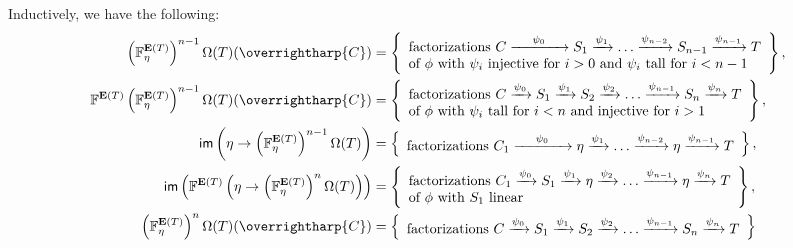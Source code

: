 \documentclass[a4paper,10pt
,draft
]{article}%
\renewcommand{\1}{\eta}%
\newcommand{\vect}[1]{\text{\overrightharp{\ensuremath{#1}}}}
\begin{document}
Inductively, we have the following:
\begin{align*}
  \left(\mathbb F^{\mathbf E(T)}_\eta \right)^{n-1} \Omega(T)(\vect C)
  & = \set{
    \begin{array}{l}
      \mbox{factorizations $C \xrightarrow{\ \quad \psi_0 \quad \ } S_1 \xrightarrow{\psi_1}
      \dots \xrightarrow{\psi_{n-2}} S_{n-1} \xrightarrow{\psi_{n-1}} T$}
      \\
      \mbox{of $\phi$ with $\psi_i$ injective for $i > 0$ and $\psi_i$ tall for $i < n-1$}
    \end{array}
  },
  \\ %
  \mathbb F^{\mathbf E(T)} \left(\mathbb F^{\mathbf E(T)}_\eta\right)^{n-1} \Omega(T) (\vect C)
  & = \set{
    \begin{array}{l}
      \mbox{factorizations $C \xrightarrow{\psi_0} S_1 \xrightarrow{\psi_1} S_2 \xrightarrow{\psi_2} \dots \xrightarrow{\psi_{n-1}} S_n \xrightarrow{\psi_n} T$}
      \\
      \mbox{of $\phi$ with $\psi_i$ tall for $i < n$ and injective for $i > 1$}
    \end{array}
  },
  \\ %
  \mathsf{im}\left(\eta \to \left(\mathbb F^{\mathbf E(T)}_{\eta}\right)^{n-1}\Omega(T)\right)
  & = \set{
    \begin{array}{l}
      \mbox{factorizations $C_1 \xrightarrow{\ \quad \psi_0 \ \quad} \eta \xrightarrow{\psi_1}
      \dots \xrightarrow{\psi_{n-2}} \eta \xrightarrow{\psi_{n-1}} T$}
    \end{array}
  },
  \\ %
  \mathsf{im}\left(\mathbb F^{\mathbf E(T)}\left( \eta \to \left(\mathbb F^{\mathbf E(T)}_{\eta}\right)^n\Omega(T)\right)\right)
  & = \set{
    \begin{array}{l}
      \mbox{factorizations $C_1 \xrightarrow{\psi_0} S_1 \xrightarrow{\psi_1} \eta \xrightarrow{\psi_2} \dots \xrightarrow{\psi_{n-1}} \eta \xrightarrow{\psi_n} T$}
      \\
      \mbox{of $\phi$ with $S_1$ linear}
    \end{array}
  },
  \\ %
  \left(\mathbb F^{\mathbf E(T)}_\eta \right)^n \Omega(T)(\vect C)
  & = \set{
    \begin{array}{l}
      \mbox{factorizations $C \xrightarrow{\psi_0} S_1 \xrightarrow{\psi_1} S_2 \xrightarrow{\psi_2} \dots \xrightarrow{\psi_{n-1}} S_n \xrightarrow{\psi_n} T$}

\end{array}}
\end{align*}
\end{document}
